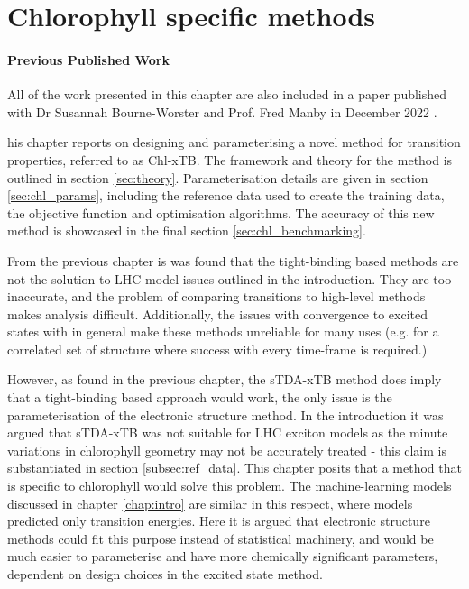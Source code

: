 %
%
\let\textcircled=\pgftextcircled
\chapter{Chlorophyll specific methods}
\label{chap:chl_xtb}

\subsubsection*{Previous Published Work}
All of the work presented in this chapter are also included in a paper published 
with Dr Susannah Bourne-Worster and Prof. Fred Manby in December 2022 \cite{Feighan2023}.

his chapter reports on designing and parameterising a novel method for
transition properties, referred to as Chl-xTB. The framework and theory for the method
is outlined in section \ref{sec:theory}. Parameterisation details are given in section \ref{sec:chl_params},
including the reference data used to create the training data, the objective function
and optimisation algorithms. The accuracy of this new method is showcased in the
final section \ref{sec:chl_benchmarking}.

From the previous chapter is was found that the tight-binding based \dxtb methods
are not the solution to LHC model issues outlined in the introduction. They are
too inaccurate, and the problem of comparing transitions to high-level methods makes
analysis difficult. Additionally, the issues with convergence to excited states 
with \dscf in general make these methods unreliable for many uses (e.g. for a correlated
set of structure where success with every time-frame is required.)

However, as found in the previous chapter, the sTDA-xTB method does imply that a 
tight-binding based approach would work, the only issue is the parameterisation of
the electronic structure method. In the introduction it was argued that sTDA-xTB
was not suitable for LHC exciton models as the minute variations in chlorophyll 
geometry may not be accurately treated - this claim is substantiated in section \ref{subsec:ref_data}.
This chapter posits that a method that is specific to chlorophyll would solve this
problem. The machine-learning models discussed in chapter \ref{chap:intro} are similar
in this respect, where models predicted only \Qy transition energies. Here it is
argued that electronic structure methods could fit this purpose instead of statistical
machinery, and would be much easier to parameterise and have more chemically significant
parameters, dependent on design choices in the excited state method. 

